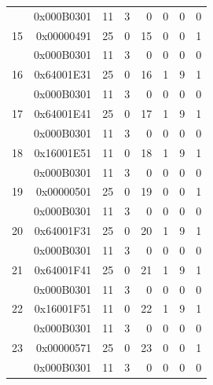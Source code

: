 \begin{longtable}{r r r r r r r r}
  & 0x000B0301 & 11 & 3 & 0 & 0 & 0 & 0 \\
15 & 0x00000491 & 25 & 0 & 15 & 0 & 0 & 1 \\
  & 0x000B0301 & 11 & 3 & 0 & 0 & 0 & 0 \\
16 & 0x64001E31 & 25 & 0 & 16 & 1 & 9 & 1 \\
  & 0x000B0301 & 11 & 3 & 0 & 0 & 0 & 0 \\
17 & 0x64001E41 & 25 & 0 & 17 & 1 & 9 & 1 \\
  & 0x000B0301 & 11 & 3 & 0 & 0 & 0 & 0 \\
18 & 0x16001E51 & 11 & 0 & 18 & 1 & 9 & 1 \\
  & 0x000B0301 & 11 & 3 & 0 & 0 & 0 & 0 \\
19 & 0x00000501 & 25 & 0 & 19 & 0 & 0 & 1 \\
  & 0x000B0301 & 11 & 3 & 0 & 0 & 0 & 0 \\
20 & 0x64001F31 & 25 & 0 & 20 & 1 & 9 & 1 \\
  & 0x000B0301 & 11 & 3 & 0 & 0 & 0 & 0 \\
21 & 0x64001F41 & 25 & 0 & 21 & 1 & 9 & 1 \\
  & 0x000B0301 & 11 & 3 & 0 & 0 & 0 & 0 \\
22 & 0x16001F51 & 11 & 0 & 22 & 1 & 9 & 1 \\
  & 0x000B0301 & 11 & 3 & 0 & 0 & 0 & 0 \\
23 & 0x00000571 & 25 & 0 & 23 & 0 & 0 & 1 \\
  & 0x000B0301 & 11 & 3 & 0 & 0 & 0 & 0 \\


\end{longtable}
